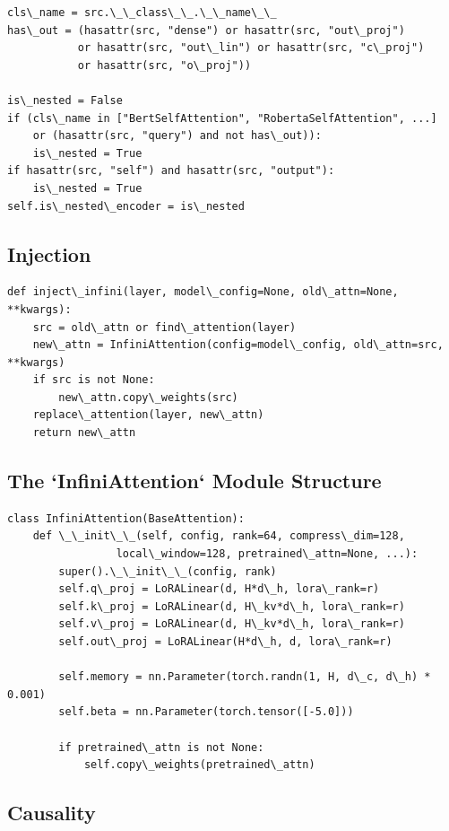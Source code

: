 \begin{lstlisting}
cls\_name = src.\_\_class\_\_.\_\_name\_\_
has\_out = (hasattr(src, "dense") or hasattr(src, "out\_proj")
           or hasattr(src, "out\_lin") or hasattr(src, "c\_proj")
           or hasattr(src, "o\_proj"))

is\_nested = False
if (cls\_name in ["BertSelfAttention", "RobertaSelfAttention", ...]
    or (hasattr(src, "query") and not has\_out)):
    is\_nested = True
if hasattr(src, "self") and hasattr(src, "output"):
    is\_nested = True
self.is\_nested\_encoder = is\_nested
\end{lstlisting}

\subsection{Injection}

\begin{lstlisting}
def inject\_infini(layer, model\_config=None, old\_attn=None, **kwargs):
    src = old\_attn or find\_attention(layer)
    new\_attn = InfiniAttention(config=model\_config, old\_attn=src, **kwargs)
    if src is not None:
        new\_attn.copy\_weights(src)
    replace\_attention(layer, new\_attn)
    return new\_attn
\end{lstlisting}

\subsection{The `InfiniAttention` Module Structure}

\begin{lstlisting}
class InfiniAttention(BaseAttention):
    def \_\_init\_\_(self, config, rank=64, compress\_dim=128,
                 local\_window=128, pretrained\_attn=None, ...):
        super().\_\_init\_\_(config, rank)
        self.q\_proj = LoRALinear(d, H*d\_h, lora\_rank=r)
        self.k\_proj = LoRALinear(d, H\_kv*d\_h, lora\_rank=r)
        self.v\_proj = LoRALinear(d, H\_kv*d\_h, lora\_rank=r)
        self.out\_proj = LoRALinear(H*d\_h, d, lora\_rank=r)
        
        self.memory = nn.Parameter(torch.randn(1, H, d\_c, d\_h) * 0.001)
        self.beta = nn.Parameter(torch.tensor([-5.0]))
        
        if pretrained\_attn is not None:
            self.copy\_weights(pretrained\_attn)
\end{lstlisting}

\subsection{Causality}

